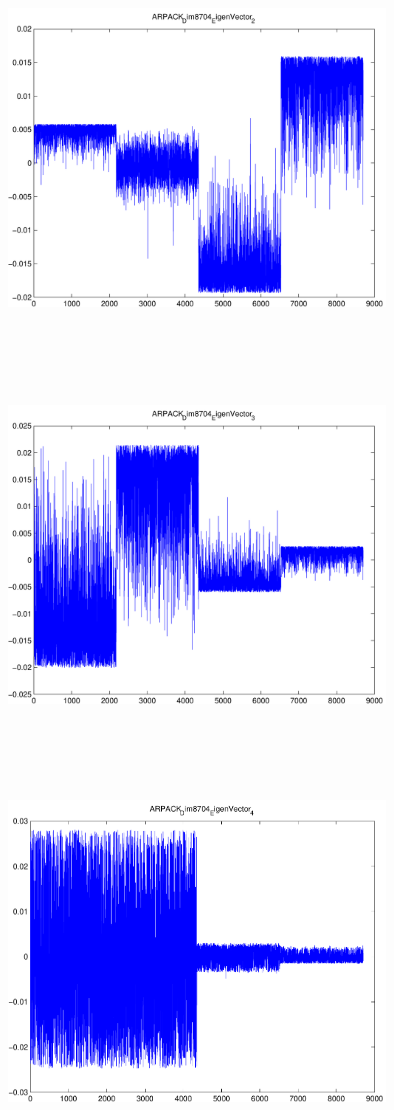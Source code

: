 \documentclass[9pt]{article}
\theoremstyle{plain}
\theoremstyle{definition}
\theoremstyle{remark}
\numberwithin{equation}{section}
\begin{document}
\includegraphics[width=10.0cm,height=10.0cm]{ARPACK_Dim8704_EigenVector_2.pdf}

\includegraphics[width=10.0cm,height=10.0cm]{ARPACK_Dim8704_EigenVector_3.pdf}

\includegraphics[width=10.0cm,height=10.0cm]{ARPACK_Dim8704_EigenVector_4.pdf}
\end{document}
